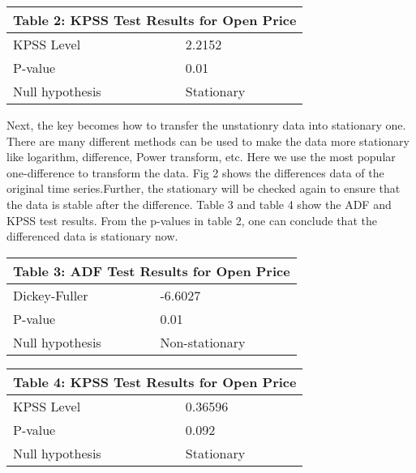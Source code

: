 \begin{table}[]
\centering
\begin{tabular}{|l|l|l|l|l|}
\hline
\multicolumn{5}{|l|}{Table 2: KPSS Test Results for Open Price}         \\ \hline
\multicolumn{3}{|l|}{KPSS Level}      & \multicolumn{2}{l|}{2.2152}     \\ \hline
\multicolumn{3}{|l|}{P-value}         & \multicolumn{2}{l|}{0.01}       \\ \hline
\multicolumn{3}{|l|}{Null hypothesis} & \multicolumn{2}{l|}{Stationary} \\ \hline
\end{tabular}
\end{table}
Next, the key becomes how to transfer the unstationry data into stationary one.  There are many different methods can be used to make the data more stationary like logarithm, difference, Power transform, etc. Here we use the most popular one-difference to transform the data. Fig 2 shows the differences data of the original time series.Further, the stationary will be checked again to ensure that the data is stable after the difference. Table 3 and table 4 show the ADF and KPSS test results. From the p-values in table 2, one can conclude that the differenced data is stationary now.  

\begin{table}[]
\centering
\begin{tabular}{|l|l|l|l|l|}
\hline
\multicolumn{5}{|l|}{Table 3: ADF Test Results for Open Price}              \\ \hline
\multicolumn{3}{|l|}{Dickey-Fuller}   & \multicolumn{2}{l|}{-6.6027}        \\ \hline
\multicolumn{3}{|l|}{P-value}         & \multicolumn{2}{l|}{0.01}           \\ \hline
\multicolumn{3}{|l|}{Null hypothesis} & \multicolumn{2}{l|}{Non-stationary} \\ \hline
\end{tabular}
\end{table}

\begin{table}[]
\centering
\begin{tabular}{|l|l|l|l|l|}
\hline
\multicolumn{5}{|l|}{Table 4: KPSS Test Results for Open Price}         \\ \hline
\multicolumn{3}{|l|}{KPSS Level}      & \multicolumn{2}{l|}{0.36596}    \\ \hline
\multicolumn{3}{|l|}{P-value}         & \multicolumn{2}{l|}{0.092}      \\ \hline
\multicolumn{3}{|l|}{Null hypothesis} & \multicolumn{2}{l|}{Stationary} \\ \hline
\end{tabular}
\end{table}


